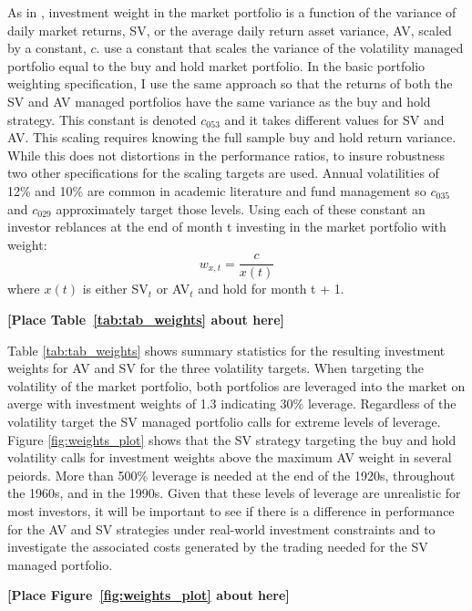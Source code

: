 As in \citet{moreira_volatility-managed_2017}, investment weight in the market portfolio is a function of the variance of daily market returns, SV, or the average daily return asset variance, AV, scaled by a constant, $c$. \citet{moreira_volatility-managed_2017} use a constant that scales the variance of the volatility managed portfolio equal to the buy and hold market portfolio. In the basic portfolio weighting specification, I use the same approach so that the returns of both the SV and AV managed portfolios have the same variance as the buy and hold strategy. This constant is denoted $c_{053}$ and it takes different values for SV and AV. This scaling requires knowing the full sample buy and hold return variance. While this does not distortions in the performance ratios, to insure robustness two other specifications for the scaling targets are used. Annual volatilities of 12\% and 10\% are common in academic literature and fund management so $c_{035}$ and $c_{029}$ approximately target those levels. \citet{barroso_momentum_2015,morrison_guarantees_nodate,verma_volatility-targeting_2018,fleming_economic_nodate,hocquard_constant-volatility_2013} Using each of these constant an investor reblances at the end of month t investing in the market portfolio with weight:
\begin{equation}
	w_{x,t} = \frac{c}{x(t)}
\end{equation} where $x(t)$ is either SV$_{t}$ or AV$_{t}$ and hold for month t + 1. 

\bigskip
\centerline{\bf [Place Table~\ref{tab:tab_weights} about here]}
\bigskip
Table \ref{tab:tab_weights} shows summary statistics for the resulting investment weights for AV and SV for the three volatility targets. When targeting the volatility of the market portfolio, both portfolios are leveraged into the market on averge with investment weights of 1.3 indicating 30\% leverage. Regardless of the volatility target the SV managed portfolio calls for extreme levels of leverage. Figure \ref{fig:weights_plot} shows that the SV strategy targeting the buy and hold volatility calls for investment weights above the maximum AV weight in several peiords. More than 500\% leverage is needed at the end of the 1920s, throughout the 1960s, and in the 1990s. Given that these levels of leverage are unrealistic for most investors, it will be important to see if there is a difference in performance for the AV and SV strategies under real-world investment constraints and to investigate the associated costs generated by the trading needed for the SV managed portfolio.
\bigskip
\centerline{\bf [Place Figure~\ref{fig:weights_plot} about here]}
\bigskip
